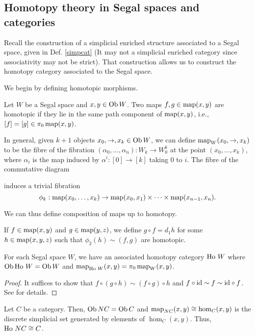 \begin{refsection}
\subsection{Homotopy theory in Segal spaces and categories}
Recall the construction of a simplicial enriched structure associated to a Segal space, given in Def. \ref{simpcat} (It may not a simplicial enriched category since associativity may not be strict). That construction allows us to construct the homotopy category associated to the Segal space.

We begin by defining homotopic morphisms.
\begin{defin}
Let $W$ be a Segal space and $x,y\in\operatorname{Ob} W$. Two maps $f,g\in\operatorname{\mathrm{map}}(x,y)$ are homotopic if they lie in the same path component of $\operatorname{\mathrm{map}}(x,y)$, i.e., $[f]=[g]\in\pi_0\operatorname{\mathrm{map}}(x,y)$.
\end{defin}

In general, given $k+1$ objects $x_0,\to,x_k\in\operatorname{Ob} W$, we can define $\operatorname{\mathrm{map}}_W(x_0,\to,x_k)$ to be the fibre of the fibration $(\alpha_0,\ldots,\alpha_n):W_k\to W_0^k$ at the point $(x_0,\ldots,x_k)$, where $\alpha_i$ is the map induced by $\alpha^i:[0]\to[k]$ taking 0 to $i$. The fibre of the commutative diagram

\centerline{}

induces a trivial fibration
$$\phi_k:\operatorname{\mathrm{map}}(x_0,\ldots,x_k)\to\operatorname{\mathrm{map}}(x_0,x_1)\times\cdots\times\operatorname{\mathrm{map}}(x_{n-1},x_n).$$

We can thus define composition of maps up to homotopy.
\begin{defin}
If $f\in\operatorname{\mathrm{map}}(x,y)$ and $g\in\operatorname{\mathrm{map}}(y,z)$, we define $g\circ f=d_1h$ for some $h\in\operatorname{\mathrm{map}}(x,y,z)$ such that $\phi_2(h)\sim(f,g)$ are homotopic.
\end{defin}

\begin{prop}
For each Segal space $W$, we have an associated homotopy category $\operatorname{\mathrm{Ho} \,} W$ where $\operatorname{Ob}\operatorname{\mathrm{Ho} \,} W=\operatorname{Ob} W$ and $\operatorname{\mathrm{map}}_{\operatorname{\mathrm{Ho} \,} W}(x,y)=\pi_0\operatorname{\mathrm{map}}_W(x,y)$.
\end{prop}
\begin{proof}
It suffices to show that $f\circ(g\circ h)\sim(f\circ g)\circ h$ and $f\circ\mathrm{id}\sim f\sim\mathrm{id}\circ f$. See \cite[Prop 5.4]{rezk} for details.
\end{proof}

\begin{eg}
Let $C$ be a category. Then, $\operatorname{Ob} NC=\operatorname{Ob} C$ and $\operatorname{\mathrm{map}}_{NC}(x,y)\cong\hom_C(x,y)$ is the discrete simplicial set generated by elements of $\hom_C(x,y)$. Thus, $\operatorname{\mathrm{Ho} \,} NC\cong C$.
\end{eg}


\end{refsection}
